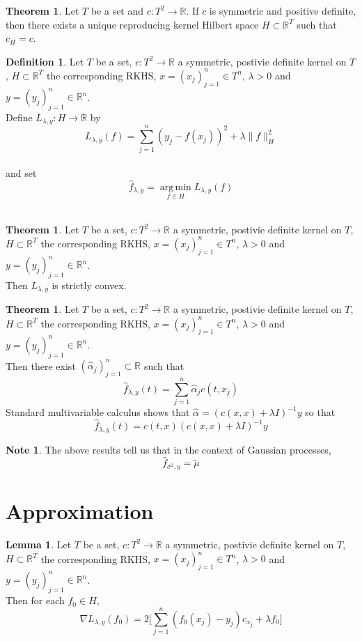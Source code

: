 \documentclass{article}
\theoremstyle{definition}
\newtheorem{defn}[definition]{Definition}
\newtheorem{note}[definition]{Note}
\newtheorem{thm}[definition]{Theorem}
\newtheorem{lem}[definition]{Lemma}
\newcommand{\al}{\alpha}
\newcommand{\lam}{\lambda}
\newcommand{\sig}{\sigma}
\newcommand{\R}{\mathbb{R}}
\DeclareMathOperator{\argmin}{arg\,min}
\begin{document}
\begin{thm}
Let $T$ be a set and $c : T^2 \rightarrow \R$. If $c$ is symmetric and positive definite, then there exists a unique reproducing kernel Hilbert space $H \subset \R^T$ such that $c_H = c$.
\end{thm}

\begin{defn}
Let $T$ be a set, $c : T^2 \rightarrow \R$ a symmetric, postivie definite kernel on $T$, $H \subset \R^T$ the corresponding RKHS, $x = (x_j)_{j=1}^n \in T^n$, $\lam > 0$ and $y = (y_j)_{j=1}^n \in \R^n$. \\
Define $L_{\lam, y}: H \rightarrow \R$ by $$L_{\lam, y}(f) = \sum_{j=1}^n (y_j - f(x_j) )^2 + \lam \|f\|_H^2$$ \\
and set $$\hat{f}_{\lam, y} = \argmin\limits_{f \in H}L_{\lam, y}(f)$$ 
\\
\end{defn}

\begin{thm}
Let $T$ be a set, $c : T^2 \rightarrow \R$ a symmetric, postivie definite kernel on $T$, $H \subset \R^T$ the corresponding RKHS, $x = (x_j)_{j=1}^n \in T^n$, $\lam > 0$ and $y = (y_j)_{j=1}^n \in \R^n$. \\
Then $L_{\lam, y}$ is strictly convex.
\end{thm}

\begin{thm}
Let $T$ be a set, $c : T^2 \rightarrow \R$ a symmetric, postivie definite kernel on $T$, $H \subset \R^T$ the corresponding RKHS, $x = (x_j)_{j=1}^n \in T^n$, $\lam > 0$ and $y = (y_j)_{j=1}^n \in \R^n$. \\
Then there exist $(\hat{\al}_j)_{j=1}^n \subset \R$ such that $$\hat{f}_{\lam, y}(t) = \sum_{j=1}^n \hat{\al}_jc(t, x_j)$$
Standard multivariable calculus shows that $\hat{\al} = (c(x,x) + \lam I)^{-1}y$ so that 
$$\hat{f}_{\lam, y}(t) = c(t,x)(c(x,x) + \lam I)^{-1}y$$
\end{thm}

\begin{note}
The above results tell us that in the context of Gaussian processes, 
$$\hat{f}_{\sig^2, y} = \tilde{\mu}$$
\end{note}

\section{Approximation}

\begin{lem}
Let $T$ be a set, $c : T^2 \rightarrow \R$ a symmetric, postivie definite kernel on $T$, $H \subset \R^T$ the corresponding RKHS, $x = (x_j)_{j=1}^n \in T^n$, $\lam > 0$ and $y = (y_j)_{j=1}^n \in \R^n$. \\
Then for each $f_0 \in H$, 
$$\nabla L_{\lam, y}(f_0) = 2\bigg [ \sum_{j=1}^n (f_0(x_j)- y_j) c_{x_j} + \lam f_0\bigg ]$$
\end{lem}
\end{document}
